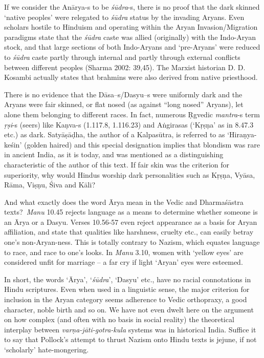 If we consider the Anārya-s to be \textit{śūdra}-s, there is no proof that the dark skinned ‘native peoples’ were relegated to \textit{śūdra} status by the invading Aryans. Even scholars hostile to Hinduism and operating within the Aryan Invasion/Migration paradigms state that the \textit{śūdra} caste was allied (originally) with the Indo-Aryan stock, and that large sections of both Indo-Aryans and ‘pre-Aryans’ were reduced to \textit{śūdra} caste partly through internal and partly through external conflicts between different peoples (Sharma 2002: 39,45). The Marxist historian D. D. Kosambi actually states that brahmins were also derived from native priesthood.

There is no evidence that the Dāsa--s/Dasyu--s were uniformly dark and the Aryans were fair skinned, or flat nosed (as against “long nosed” Aryans), let alone them belonging to different races. In fact, numerous Ṛgvedic \textit{mantra}-s term \textit{ṛṣi}-s (seers) like Kaṇva-s (1.117.8, 1.116.23) and Aṅgirasas (‘Kṛṣṇa’ as in 8.47.3 etc.) as dark. Satyāṣāḍha, the author of a Kalpasūtra, is referred to as ‘Hiraṇya-keśin’ (golden haired) and this special designation implies that blondism was rare in ancient India, as it is today, and was mentioned as a distinguishing characteristic of the author of this text. If fair skin was the criterion for superiority, why would Hindus worship dark personalities such as Kṛṣṇa, Vyāsa, Rāma, Viṣṇu, Śiva and Kāli?

And what exactly does the word Ārya mean in the Vedic and Dharmaśāstra texts?~\textit{Manu} 10.45 rejects language as a means to determine whether someone is an Ārya or a Dasyu. Verses 10.56-57 even reject appearance as a basis for Aryan affiliation, and state that qualities like harshness, cruelty etc., can easily betray one’s non-Aryan-ness. This is totally contrary to Nazism, which equates language to race, and race to one’s looks. In \textit{Manu} 3.10, women with ‘yellow eyes’ are considered unfit for marriage – a far cry if light ‘Aryan’ eyes were esteemed.

In short, the words ‘Ārya’, ‘\textit{śūdra}’, ‘Dasyu’ etc., have no racial connotations in Hindu scriptures. Even when used in a linguistic sense, the major criterion for inclusion in the Aryan category seems adherence to Vedic orthopraxy, a good character, noble birth and so on. We have not even dwelt here on the argument on how complex (and often with no basis in social reality) the theoretical interplay between \textit{varṇa-jāti-gotra-kula} systems was in historical India. Suffice it to say that Pollock’s attempt to thrust Nazism onto Hindu texts is jejune, if not ‘scholarly’ hate-mongering.

